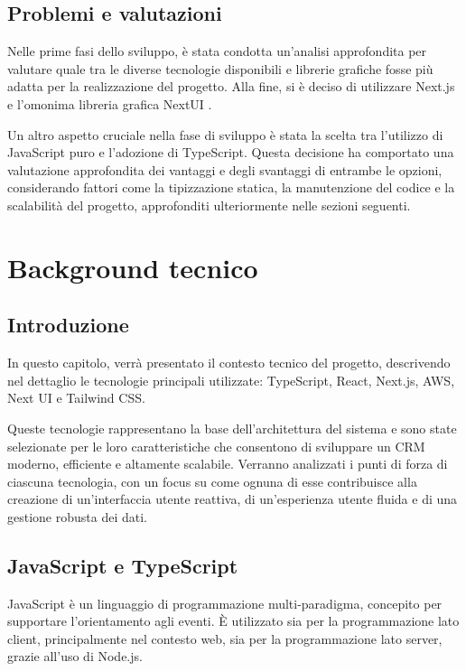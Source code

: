 \documentclass[target=bach,aauheader=,style=]{thud}
\begin{document}
\section{Problemi e valutazioni}
Nelle prime fasi dello sviluppo, è stata condotta un'analisi approfondita per valutare quale tra le diverse tecnologie disponibili e librerie grafiche fosse più adatta per la realizzazione del progetto. Alla fine, si è deciso di utilizzare Next.js \cite{nextjs2024} e l'omonima libreria grafica NextUI \cite{nextui2024}. 

\noindent Un altro aspetto cruciale nella fase di sviluppo è stata la scelta tra l'utilizzo di JavaScript puro e l'adozione di TypeScript. Questa decisione ha comportato una valutazione approfondita dei vantaggi e degli svantaggi di entrambe le opzioni, considerando fattori come la tipizzazione statica, la manutenzione del codice e la scalabilità del progetto, approfonditi ulteriormente nelle sezioni seguenti.


\chapter{Background tecnico}

\section{Introduzione}
In questo capitolo, verrà presentato il contesto tecnico del progetto, descrivendo nel dettaglio le tecnologie principali utilizzate: TypeScript, React, Next.js, AWS, Next UI e Tailwind CSS. 

\noindent Queste tecnologie rappresentano la base dell'architettura del sistema e sono state selezionate per le loro caratteristiche che consentono di sviluppare un CRM moderno, efficiente e altamente scalabile. Verranno analizzati i punti di forza di ciascuna tecnologia, con un focus su come ognuna di esse contribuisce alla creazione di un'interfaccia utente reattiva, di un'esperienza utente fluida e di una gestione robusta dei dati.

\section{JavaScript e TypeScript}
JavaScript \cite{wikipedia:javascript} è un linguaggio di programmazione multi-paradigma, concepito per supportare l'orientamento agli eventi. È utilizzato sia per la programmazione lato client, principalmente nel contesto web, sia per la programmazione lato server, grazie all'uso di Node.js. 
\end{document}
